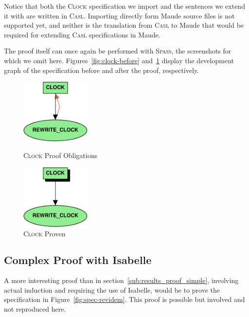\documentclass[11pt]{article}
\newcommand{\Casl}{\textsc{Casl}}
\newcommand{\Spass}{\textsc{Spass}}
\begin{document}
Notice that both the \textsc{Clock} specification we import and the sentences we extend it with are written in \Casl{}. Importing directly form Maude source files is not supported yet, and neither is the translation from \Casl{} to Maude that would be required for extending \Casl{} specifications in Maude.

The proof itself can once again be performed with \Spass{}, the screenshots for which we omit here. Figures~\ref{fig:clock-before} and~\ref{fig:clock-after} display the development graph of the specification before and after the proof, respectively.

\begin{figure}
  \begin{minipage}[b]{0.5\textwidth}
    \begin{centering}
      \includegraphics[width=3.5cm]{Clock-before.pdf}
      \caption{\textsc{Clock} Proof Obligations}\label{fig:clock-before}
    \end{centering}
  \end{minipage}
  \begin{minipage}[b]{0.5\textwidth}
    \begin{centering}
	    \includegraphics[width=3.5cm]{Clock-after.pdf}
	    \caption{\textsc{Clock} Proven}\label{fig:clock-after}
    \end{centering}
  \end{minipage}
\end{figure}


\subsection{Complex Proof with Isabelle}
\label{sub:results_proof_complex}

A more interesting proof than in section~\ref{sub:results_proof_simple}, involving actual induction and requiring the use of Isabelle, would be to prove the specification in Figure~\ref{fig:spec-revidem}. This proof is possible but involved and not reproduced here.
\end{document}
